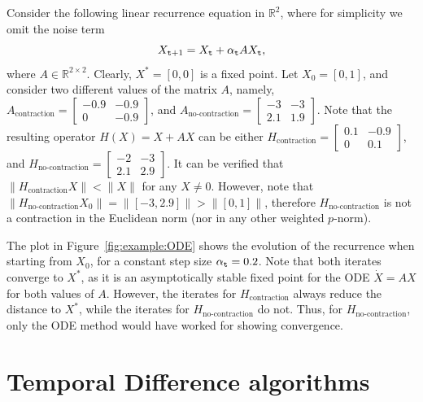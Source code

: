 \begin{example}
\label{example:ODE}
    Consider the following linear recurrence equation in $\mathbb{R}^2$, where for simplicity we omit the noise term
    \begin{equation*}
        X_{{\tt t}+1} =
X_{\tt t}+\alpha_{\tt t} A X_{\tt t},
    \end{equation*}
    where $A \in \mathbb{R}^{2 \times 2}.$ Clearly, $X^* = [0,0]$ is a fixed point. Let $X_0 = [0, 1]$, and consider two different values of the matrix $A$, namely, $A_{\textrm{contraction}} = \begin{bmatrix}
-0.9 & -0.9 \\
0 & -0.9
\end{bmatrix}$, and $A_{\textrm{no-contraction}} = \begin{bmatrix}
-3 & -3 \\
2.1 & 1.9
\end{bmatrix}$. Note that the resulting operator $H(X) = X + AX$ can be either $H_{\textrm{contraction}} = \begin{bmatrix}
0.1 & -0.9 \\
0 & 0.1
\end{bmatrix}$, and $H_{\textrm{no-contraction}} = \begin{bmatrix}
-2 & -3 \\
2.1 & 2.9
\end{bmatrix}$. It can be verified that $\|H_{\textrm{contraction}} X\| < \|X\|$ for any $X \neq 0$. However, note that $\|H_{\textrm{no-contraction}} X_0 \| = \| [-3, 2.9] \| > \|[0, 1]\|$, therefore $H_{\textrm{no-contraction}}$ is not a contraction in the Euclidean norm (nor in any other weighted $p$-norm).

The  plot  in Figure~\ref{fig:example:ODE} shows the evolution of the recurrence when starting from $X_0$, for a constant step size $\alpha_{\tt t} = 0.2$. Note that both iterates converge to $X^*$, as it is an asymptotically stable fixed point for the ODE $\dot{X} = AX$ for both values of $A$. However, the iterates for $H_{\textrm{contraction}}$ always reduce the distance to $X^*$, while the iterates for $H_{\textrm{no-contraction}}$ do not. Thus, for $H_{\textrm{no-contraction}}$, only the ODE method would have worked for showing convergence.
\end{example}




\section{Temporal Difference algorithms}
\label{sec:TD}

